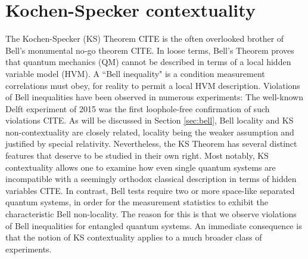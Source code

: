 \chapter{Kochen-Specker contextuality}
The Kochen-Specker (KS) Theorem CITE is the often overlooked brother of Bell's monumental no-go theorem CITE. In loose terms, Bell's Theorem proves that quantum mechanics (QM) cannot be described in terms of a local hidden variable model (HVM). A ``Bell inequality" is a condition measurement correlations must obey, for reality to permit a local HVM description. Violations of Bell inequalities have been observed in numerous experiments: The well-known Delft experiment of 2015 was the first loophole-free confirmation of such violations CITE. As will be discussed in Section \ref{sec:bell}, Bell locality and KS non-contextuality are closely related, locality being the weaker assumption and justified by special relativity. Nevertheless, the KS Theorem has several distinct features that deserve to be studied in their own right. Most notably, KS contextuality allows one to examine how even single quantum systems are incompatible with a seemingly orthodox classical description in terms of hidden variables CITE. In contrast, Bell tests require two or more space-like separated quantum systems, in order for the measurement statistics to exhibit the characteristic Bell non-locality. The reason for this is that we observe violations of Bell inequalities for entangled quantum systems. An immediate consequence is that the notion of KS contextuality applies to a much broader class of experiments.


